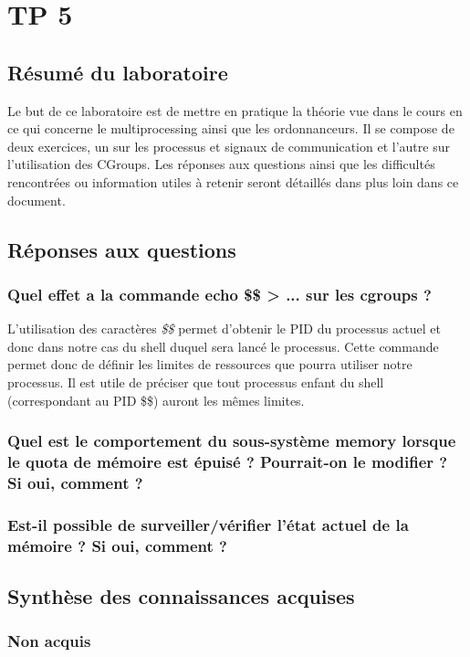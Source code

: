 \documentclass{ReportTemplate}
\begin{document}
\chapter{TP 5}
\section{Résumé du laboratoire}
Le but de ce laboratoire est de mettre en pratique la théorie vue dans le cours
en ce qui concerne le multiprocessing ainsi que les ordonnanceurs. Il se compose
de deux exercices, un sur les processus et signaux de communication et l'autre
sur l'utilisation des CGroups. Les réponses aux questions ainsi que les
difficultés rencontrées ou information utiles à retenir seront détaillés dans
plus loin dans ce document.

\section{Réponses aux questions}
\subsection{Quel effet a la commande echo \$\$ > ... sur les cgroups ?}
L'utilisation des caractères \textit{\$\$} permet d'obtenir le PID du processus
actuel et donc dans notre cas du shell duquel sera lancé le processus. Cette
commande permet donc de définir les limites de ressources que pourra utiliser
notre processus. Il est utile de préciser que tout processus enfant du shell
(correspondant au PID \$\$) auront les mêmes limites.
\subsection{Quel est le comportement du sous-système memory lorsque le quota de mémoire est épuisé ? Pourrait-on le modifier ? Si oui, comment ?}

\subsection{Est-il possible de surveiller/vérifier l’état actuel de la mémoire ? Si oui, comment ?}

\section{Synthèse des connaissances acquises}
\subsection{Non acquis}
\end{document}
